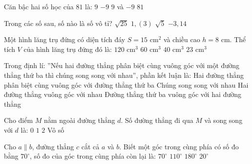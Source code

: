 \documentclass[12pt,a4paper]{article}
\begin{document}
\begin{ex}
Căn bậc hai số học của $81$ là:
\choice
{\True $9$}
{$-9$}
{$9$ và $-9$}
{$81$}
\end{ex}

\begin{ex}
Trong các số sau, số nào là số vô tỉ?
\choice
{$\sqrt{25}$}
{$1{,}(3)$}
{\True $\sqrt{5}$}
{$-3{,}14$}
\end{ex}

\begin{ex}
Một hình lăng trụ đứng có diện tích đáy $S = 15\text{ cm}^2$ và chiều cao $h = 8\text{ cm}$. Thể tích $V$ của hình lăng trụ đứng đó là:
\choice
{\True $120\text{ cm}^3$}
{$60\text{ cm}^3$}
{$40\text{ cm}^3$}
{$23\text{ cm}^3$}
\end{ex}

\begin{ex}
Trong định lí: ''Nếu hai đường thẳng phân biệt cùng vuông góc với một đường thẳng thứ ba thì chúng song song với nhau'', phần kết luận là:
\choice
{Hai đường thẳng phân biệt cùng vuông góc với đường thẳng thứ ba}
{\True Chúng song song với nhau}
{Hai đường thẳng vuông góc với nhau}
{Đường thẳng thứ ba vuông góc với hai đường thẳng}
\end{ex}

\begin{ex}
Cho điểm $M$ nằm ngoài đường thẳng $d$. Số đường thẳng đi qua $M$ và song song với $d$ là:
\choice
{$0$}
{\True $1$}
{$2$}
{Vô số}
\end{ex}

\begin{ex}
Cho $a \parallel b$, đường thẳng $c$ cắt cả $a$ và $b$. Biết một góc trong cùng phía có số đo bằng $70^\circ$, số đo của góc trong cùng phía còn lại là:
\choice
{$70^\circ$}
{\True $110^\circ$}
{$180^\circ$}
{$20^\circ$}
\end{ex}
\end{document}
